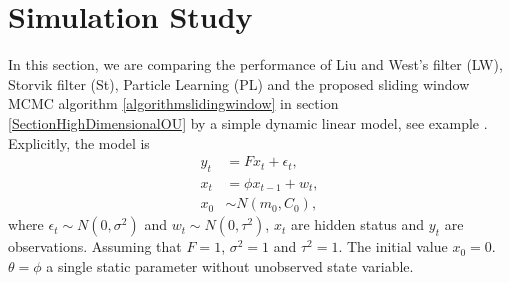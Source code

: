 \section{Simulation Study}\label{sectionFilterreviewSimulation}



In this section, we are comparing the performance of Liu and West's filter (LW), Storvik filter (St), Particle Learning (PL) and the proposed sliding window MCMC algorithm \ref{algorithmslidingwindow} in section \ref{SectionHighDimensionalOU} by a simple dynamic linear model, see example \cite{liu2001combined}. Explicitly, the model is 
\begin{align*}
y_t&=F x_t+\epsilon_t,\\
x_t&=\phi x_{t-1}+w_t,\\
x_0&\sim N(m_0,C_0),
\end{align*}
where $\epsilon_t\sim N(0,\sigma^2)$ and $w_t\sim N(0,\tau^2)$, $x_t$ are hidden status and $y_t$ are observations. Assuming that $F=1$, $\sigma^2=1$ and $\tau^2=1$. The initial value $x_0=0$. $\theta = \phi$ a single static parameter without unobserved state variable. 

